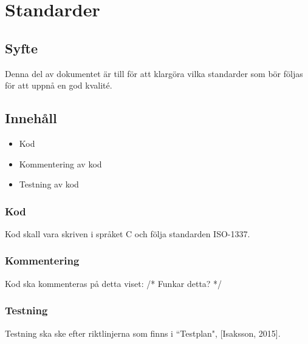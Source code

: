 \section{Standarder}

\subsection{Syfte}
Denna del av dokumentet är till för att klargöra vilka standarder som bör följas för att uppnå en god kvalité.

\subsection{Innehåll}
\begin{itemize}
\item Kod
\item Kommentering av kod
\item Testning av kod
\end{itemize}

\subsubsection{Kod}
Kod skall vara skriven i språket C och följa standarden ISO-1337.

\subsubsection{Kommentering}
Kod ska kommenteras på detta viset:
/* Funkar detta? */

\subsubsection{Testning}
Testning ska ske efter riktlinjerna som finns i ``Testplan", [Isaksson, 2015]. 
